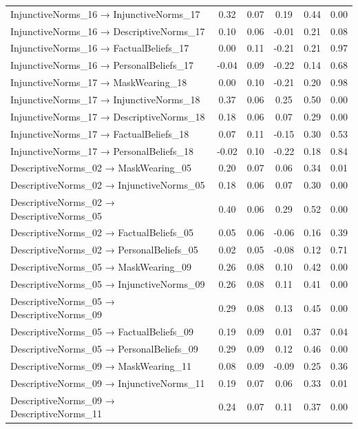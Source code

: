 \documentclass[
  man, donotrepeattitle,floatsintext]{apa6}
\begin{document}
\begin{center}
\begin{ThreePartTable}
{\begin{longtable}{lccccc}
InjunctiveNorms\_16 → InjunctiveNorms\_17 & 0.32 & 0.07 & 0.19 & 0.44 & 0.00\\
InjunctiveNorms\_16 → DescriptiveNorms\_17 & 0.10 & 0.06 & -0.01 & 0.21 & 0.08\\
InjunctiveNorms\_16 → FactualBeliefs\_17 & 0.00 & 0.11 & -0.21 & 0.21 & 0.97\\
InjunctiveNorms\_16 → PersonalBeliefs\_17 & -0.04 & 0.09 & -0.22 & 0.14 & 0.68\\
InjunctiveNorms\_17 → MaskWearing\_18 & 0.00 & 0.10 & -0.21 & 0.20 & 0.98\\
InjunctiveNorms\_17 → InjunctiveNorms\_18 & 0.37 & 0.06 & 0.25 & 0.50 & 0.00\\
InjunctiveNorms\_17 → DescriptiveNorms\_18 & 0.18 & 0.06 & 0.07 & 0.29 & 0.00\\
InjunctiveNorms\_17 → FactualBeliefs\_18 & 0.07 & 0.11 & -0.15 & 0.30 & 0.53\\
InjunctiveNorms\_17 → PersonalBeliefs\_18 & -0.02 & 0.10 & -0.22 & 0.18 & 0.84\\
DescriptiveNorms\_02 → MaskWearing\_05 & 0.20 & 0.07 & 0.06 & 0.34 & 0.01\\
DescriptiveNorms\_02 → InjunctiveNorms\_05 & 0.18 & 0.06 & 0.07 & 0.30 & 0.00\\
DescriptiveNorms\_02 → DescriptiveNorms\_05 & 0.40 & 0.06 & 0.29 & 0.52 & 0.00\\
DescriptiveNorms\_02 → FactualBeliefs\_05 & 0.05 & 0.06 & -0.06 & 0.16 & 0.39\\
DescriptiveNorms\_02 → PersonalBeliefs\_05 & 0.02 & 0.05 & -0.08 & 0.12 & 0.71\\
DescriptiveNorms\_05 → MaskWearing\_09 & 0.26 & 0.08 & 0.10 & 0.42 & 0.00\\
DescriptiveNorms\_05 → InjunctiveNorms\_09 & 0.26 & 0.08 & 0.11 & 0.41 & 0.00\\
DescriptiveNorms\_05 → DescriptiveNorms\_09 & 0.29 & 0.08 & 0.13 & 0.45 & 0.00\\
DescriptiveNorms\_05 → FactualBeliefs\_09 & 0.19 & 0.09 & 0.01 & 0.37 & 0.04\\
DescriptiveNorms\_05 → PersonalBeliefs\_09 & 0.29 & 0.09 & 0.12 & 0.46 & 0.00\\
DescriptiveNorms\_09 → MaskWearing\_11 & 0.08 & 0.09 & -0.09 & 0.25 & 0.36\\
DescriptiveNorms\_09 → InjunctiveNorms\_11 & 0.19 & 0.07 & 0.06 & 0.33 & 0.01\\
DescriptiveNorms\_09 → DescriptiveNorms\_11 & 0.24 & 0.07 & 0.11 & 0.37 & 0.00\\

\end{longtable}}
\end{ThreePartTable}
\end{center}
\end{document}
